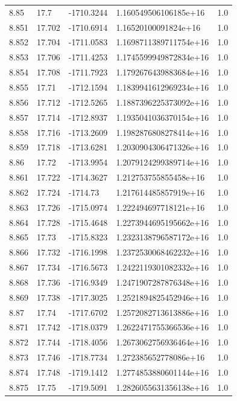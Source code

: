 \begin{tabular}{lllll}
8.85 & 17.7 & -1710.3244 & 1.160549506106185e+16 & 1.0 \\
8.851 & 17.702 & -1710.6914 & 1.16520100091824e+16 & 1.0 \\
8.852 & 17.704 & -1711.0583 & 1.1698711389711754e+16 & 1.0 \\
8.853 & 17.706 & -1711.4253 & 1.1745599949872834e+16 & 1.0 \\
8.854 & 17.708 & -1711.7923 & 1.1792676439883684e+16 & 1.0 \\
8.855 & 17.71 & -1712.1594 & 1.1839941612969234e+16 & 1.0 \\
8.856 & 17.712 & -1712.5265 & 1.1887396225373092e+16 & 1.0 \\
8.857 & 17.714 & -1712.8937 & 1.1935041036370154e+16 & 1.0 \\
8.858 & 17.716 & -1713.2609 & 1.1982876808278414e+16 & 1.0 \\
8.859 & 17.718 & -1713.6281 & 1.2030904306471326e+16 & 1.0 \\
8.86 & 17.72 & -1713.9954 & 1.2079124299389714e+16 & 1.0 \\
8.861 & 17.722 & -1714.3627 & 1.212753755855458e+16 & 1.0 \\
8.862 & 17.724 & -1714.73 & 1.217614485857919e+16 & 1.0 \\
8.863 & 17.726 & -1715.0974 & 1.222494697718121e+16 & 1.0 \\
8.864 & 17.728 & -1715.4648 & 1.2273944695195662e+16 & 1.0 \\
8.865 & 17.73 & -1715.8323 & 1.2323138796587172e+16 & 1.0 \\
8.866 & 17.732 & -1716.1998 & 1.2372530068462232e+16 & 1.0 \\
8.867 & 17.734 & -1716.5673 & 1.2422119301082332e+16 & 1.0 \\
8.868 & 17.736 & -1716.9349 & 1.2471907287876348e+16 & 1.0 \\
8.869 & 17.738 & -1717.3025 & 1.2521894825452946e+16 & 1.0 \\
8.87 & 17.74 & -1717.6702 & 1.2572082713613886e+16 & 1.0 \\
8.871 & 17.742 & -1718.0379 & 1.2622471755366536e+16 & 1.0 \\
8.872 & 17.744 & -1718.4056 & 1.2673062756936464e+16 & 1.0 \\
8.873 & 17.746 & -1718.7734 & 1.272385652778086e+16 & 1.0 \\
8.874 & 17.748 & -1719.1412 & 1.2774853880601144e+16 & 1.0 \\
8.875 & 17.75 & -1719.5091 & 1.2826055631356138e+16 & 1.0 \\

\end{tabular}
